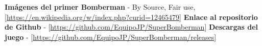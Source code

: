 \documentclass[a4paper]{article}
\begin{document}
\begin{thebibliography}{99}
	 \textbf{Imágenes del primer Bomberman} - By Source, Fair use, [\url{https://en.wikipedia.org/w/index.php?curid=12465479}]
	\bibitem{} \textbf{Enlace al repositorio de Github} - [\url{https://github.com/EquipoJP/SuperBomberman}]
	\bibitem{} \textbf{Descargas del juego} - [\url{https://github.com/EquipoJP/SuperBomberman/releases}]
\end{thebibliography}
\end{document}
